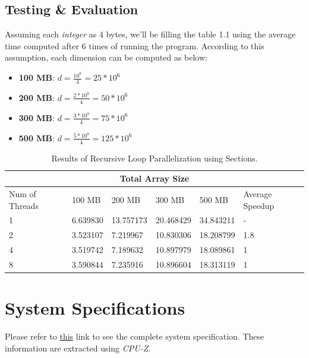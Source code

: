 \documentclass[12pt]{article}
\numberwithin{equation}{section}
\numberwithin{table}{section}
\numberwithin{figure}{section}
\begin{document}
\subsection{Testing \& Evaluation}
Assuming each \textit{integer} as 4 bytes, we'll be filling the table 1.1 using the average time  computed after 6 times of running the program. According to this assumption, each dimension can be computed as below:
\begin{itemize}
	\item \textbf{100 MB}:  $d = \frac{10^8}{4} = 25 * 10^6$
	\item \textbf{200 MB}:  $d = \frac{2 * 10^8}{4} = 50 * 10^6$
	\item \textbf{300 MB}:  $d = \frac{3 * 10^8}{4} = 75 * 10^6$
	\item \textbf{500 MB}:  $d = \frac{5 * 10^8}{4} = 125 * 10^6$
\end{itemize}

\def\arraystretch{1.3}
\begin{table}[!h]
	\centering
	\begin{tabular}{ |p{3cm}||p{2cm}|p{2cm}|p{2cm}|p{2cm}|p{1.5cm}|  }
		
		\hline
		\multicolumn{6}{|c|}{Total Array Size} \\
		\hline
		Num of Threads & 100 MB & 200 MB & 300 MB & 500 MB & Average Speedup\\
		\hline
		1   & 6.639830    & 13.757173 & 20.468429  &   34.843211 &   -\\
		2   & 3.523107    & 7.219967  & 10.830306  &   18.208799 &   1.8\\
		4   & 3.519742    & 7.189632  & 10.897979  &   18.089861 &   1\\
		8   & 3.590844    & 7.235916  & 10.896604  &  18.313119  &  1\\
		\hline
	\end{tabular}
	\caption{Results of Recursive Loop Parallelization using Sections.}
	\label{figsolplot}
\end{table}

\section{System Specifications} 
Please refer to {\UrlFont\href{https://www.dropbox.com/s/chkpoyd5rhhf7z8/ASUS_N56JK.html?dl=0}{this}} link to see the complete system specification. These information are extracted using \textit{CPU-Z}.
\end{document}
